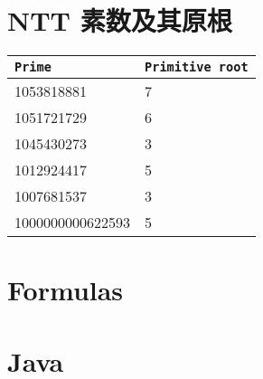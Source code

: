 \section{NTT 素数及其原根}
\begin{tabular}{|l|l|}
	\hline
	\texttt{Prime} & \texttt{Primitive root} \\
	\hline
	1053818881 & 7 \\
	\hline
	1051721729 & 6 \\
	\hline
	1045430273 & 3 \\
	\hline
	1012924417 & 5 \\
	\hline
	1007681537 & 3 \\
	\hline
	1000000000622593 & 5 \\
	\hline
\end{tabular}

\section{Formulas}



\section{Java}
\inputminted{java}{\source/hints/template.java}

